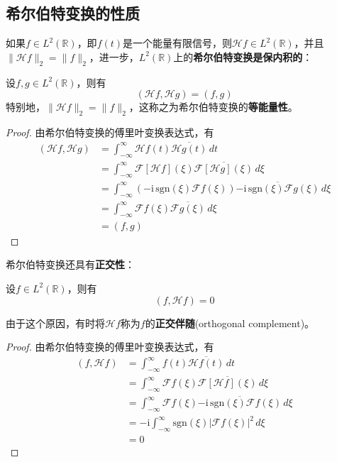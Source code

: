 \documentclass{ctexbook}
\begin{document}
\subsection{希尔伯特变换的性质}\label{sub:prop_of_hilbert}

如果$f\in L^2(\mathbb{R})$，即$f(t)$是一个能量有限信号，则$\mathcal{H} f\in L^2(\mathbb{R})$，并且$\|\mathcal{H} f\|_2=\|f\|_2$，进一步，$L^2(\mathbb{R})$上的\textbf{希尔伯特变换是保内积的}：
\begin{theorem}
    设$f,g\in L^2(\mathbb{R})$，则有
    \[(\mathcal{H} f,\mathcal{H} g)=(f,g)\]
    特别地，$\|\mathcal{H} f\|_2=\|f\|_2$，这称之为希尔伯特变换的\textbf{等能量性}。
\end{theorem}
\begin{proof}
    由希尔伯特变换的傅里叶变换表达式，有
    \begin{align*}
        (\mathcal{H} f,\mathcal{H} g)&=\int_{-\infty}^{\infty}\mathcal{H} f(t)\overline{\mathcal{H} g(t)}\,dt\\
        &=\int_{-\infty}^{\infty}\mathcal{F} [\mathcal{H} f](\xi)\overline{\mathcal{F} [\mathcal{H} g](\xi)}\,d\xi\\
        &=\int_{-\infty}^{\infty}(-\mathrm{i}\,\text{sgn}(\xi)\mathcal{F} f(\xi))\overline{-\mathrm{i}\,\text{sgn}(\xi)\mathcal{F} g(\xi)}\,d\xi\\
        &=\int_{-\infty}^{\infty}\mathcal{F} f(\xi)\overline{\mathcal{F} g(\xi)}\,d\xi\\
        &=(f,g)
    \end{align*}
\end{proof}

希尔伯特变换还具有\textbf{正交性}：
\begin{theorem}
    设$f\in L^2(\mathbb{R})$，则有
    \[(f,\mathcal{H} f)=0\]
\end{theorem}
由于这个原因，有时将$\mathcal{H} f$称为$f$的\textbf{正交伴随}(orthogonal complement)。
\begin{proof}
    由希尔伯特变换的傅里叶变换表达式，有
    \begin{align*}
        (f,\mathcal{H} f)&=\int_{-\infty}^{\infty}f(t)\overline{\mathcal{H} f(t)}\,dt\\
        &=\int_{-\infty}^{\infty}\mathcal{F} f(\xi)\overline{\mathcal{F} [\mathcal{H} f](\xi)}\,d\xi\\
        &=\int_{-\infty}^{\infty}\mathcal{F} f(\xi)\overline{-\mathrm{i}\,\text{sgn}(\xi)\mathcal{F} f(\xi)}\,d\xi\\
        &=-\mathrm{i}\int_{-\infty}^{\infty}\text{sgn}(\xi)|\mathcal{F} f(\xi)|^2\,d\xi\\
        &=0
    \end{align*}
\end{proof}
\end{document}
